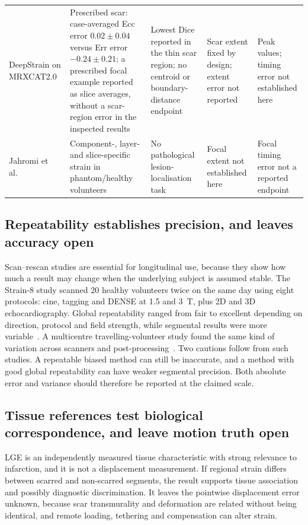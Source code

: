 {\begin{longtable}{L{0.13\textwidth}L{0.19\textwidth}L{0.18\textwidth}L{0.17\textwidth}L{0.17\textwidth}}
\addlinespace
DeepStrain on MRXCAT2.0~\cite{mrxcat2023} & Prescribed scar: case-averaged Ecc error \(0.02\pm0.04\) versus Err error \(-0.24\pm0.21\); a prescribed focal example reported as slice averages, without a scar-region error in the inspected results & Lowest Dice reported in the thin scar region; no centroid or boundary-distance endpoint & Scar extent fixed by design; extent error not reported & Peak values; timing error not established here \\
\addlinespace
Jahromi et al.~\cite{jahromi2026densecine} & Component-, layer- and slice-specific strain in phantom/healthy volunteers & No pathological lesion-localisation task & Focal extent not established here & Focal timing error not a reported endpoint \\
\bottomrule
\end{longtable}
}

\subsection{Repeatability establishes precision, and leaves accuracy open}

Scan--rescan studies are essential for longitudinal use, because they show how much a result may change when the underlying subject is assumed stable. The Strain-8 study scanned 20 healthy volunteers twice on the same day using eight protocols: cine, tagging and DENSE at 1.5 and 3~T, plus 2D and 3D echocardiography. Global repeatability ranged from fair to excellent depending on direction, protocol and field strength, while segmental results were more variable~\cite{bell2025strain8}. A multicentre travelling-volunteer study found the same kind of variation across scanners and post-processing~\cite{goetze2026}. Two cautions follow from such studies. A repeatable biased method can still be inaccurate, and a method with good global repeatability can have weaker segmental precision. Both absolute error and variance should therefore be reported at the claimed scale.

\subsection{Tissue references test biological correspondence, and leave motion truth open}

LGE is an independently measured tissue characteristic with strong relevance to infarction, and it is not a displacement measurement. If regional strain differs between scarred and non-scarred segments, the result supports tissue association and possibly diagnostic discrimination. It leaves the pointwise displacement error unknown, because scar transmurality and deformation are related without being identical, and remote loading, tethering and compensation can alter strain.

